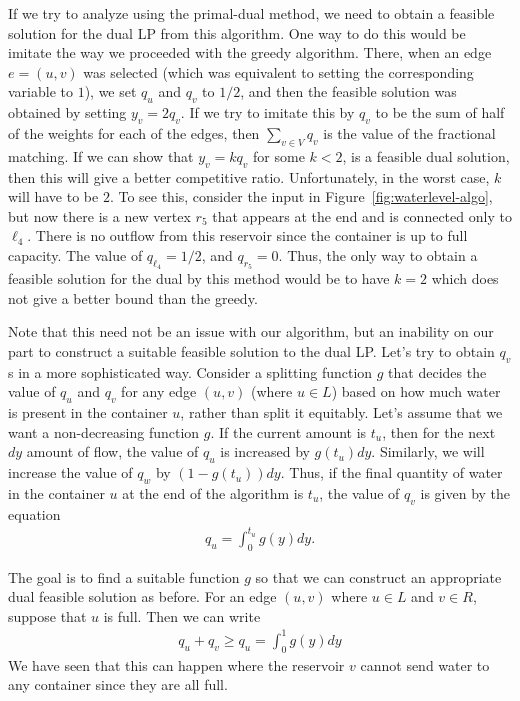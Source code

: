 If we try to analyze using the primal-dual method, we need to obtain a feasible
solution for the dual LP from this algorithm. One way to do this would be
imitate the way we proceeded with the greedy algorithm. There, when an edge
$e = (u,v)$ was selected (which was equivalent to setting the corresponding
variable to $1$), we set $q_u$ and $q_v$ to $1/2$, and then the feasible
solution was obtained by setting $y_v = 2q_v$. If we try to imitate this by
$q_v$ to be the sum of half of the weights for each of the edges, then
$\sum_{v\in V} q_v$ is the value of the fractional matching. If we can show that
$y_v = kq_v$ for some $k < 2$, is a feasible dual solution, then this will give
a better competitive ratio. Unfortunately, in the worst case, $k$ will have to
be $2$. To see this, consider the input in Figure~\ref{fig:waterlevel-algo}, but
now there is a new vertex $r_5$ that appears at the end and is connected only to
$\ell_4$. There is no outflow from this reservoir since the container is up to
full capacity. The value of $q_{\ell_4} = 1/2$, and $q_{r_5} = 0$. Thus, the
only way to obtain a feasible solution for the dual by this method would be to
have $k=2$ which does not give a better bound than the greedy.

Note that this need not be an issue with our algorithm, but an inability on our
part to construct a suitable feasible solution to the dual LP. Let's try to
obtain $q_v$s in a more sophisticated way. Consider a splitting function $g$
that decides the value of $q_u$ and $q_v$ for any edge $(u,v)$ (where $u\in L$)
based on how much water is present in the container $u$, rather than split it
equitably. Let's assume that we want a non-decreasing function $g$. If the
current amount is $t_u$, then for the next $dy$ amount of flow, the value of
$q_u$ is increased by $g(t_u) dy$. Similarly, we will increase the value of
$q_w$ by $(1 - g(t_u))dy$. Thus, if the final quantity of water in the container
$u$ at the end of the algorithm is $t_u$, the value of $q_v$ is given by the
equation
\begin{align*}
  q_u = \int_0^{t_u} g(y) dy.
\end{align*}

The goal is to find a suitable function $g$ so that we can construct an
appropriate dual feasible solution as before. For an edge $(u,v)$ where $u\in L$
and $v\in R$, suppose that $u$ is full. Then we can write
\begin{align*}
  q_u + q_v \geq q_u = \int_0^{1} g(y) dy
\end{align*}
We have seen that this can happen where the reservoir $v$ cannot send water to any container since they are all full.

